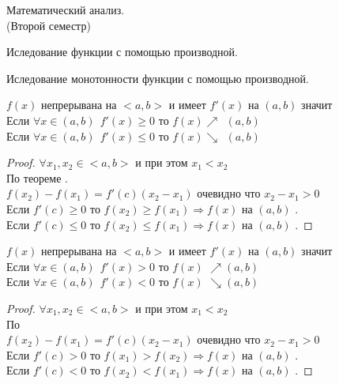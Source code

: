 \begin{title}
  Математический анализ.\\
  (Второй семестр)
\end{title}

\begin{title}
  Иследование функции с помощью производной.
\end{title}

\begin{title}[\Large]
  Иследование монотонности функции с помощью производной.
\end{title}

\begin{theorem}
  $f(x)$ непрерывана на $<a,b>$ и имеет $f'(x)$ на $(a,b)$ значит
  \\
  Если $\forall x \in (a,b) ~~ f'(x) \ge 0 $ то $f(x) \nearrow ~~ (a,b)$\\
  Если $\forall x \in (a,b) ~~ f'(x) \le 0 $ то $f(x) \searrow ~~ (a,b)$
\end{theorem}

\begin{proof}
  $\forall x_1, x_2 \in <a,b>$ и при этом $x_1 < x_2 $\\
  По теореме .\\
  $f(x_2) - f(x_1) = f'(c)(x_2 - x_1)$ очевидно что $x_2 - x_1 > 0 $\\
  Если $f'(c) \ge 0$ то $f(x_2) \ge f(x_1) \Rightarrow f(x)$ на $(a,b)$
  .\\
  Если $f'(c) \le 0$ то $f(x_2) \le f(x_1) \Rightarrow f(x)$ на $(a,b)$
  .
\end{proof}

\begin{theorem}
  $f(x)$ непрерывана на $<a,b>$ и имеет $f'(x)$ на $(a,b)$ значит\\
  Если $\forall x \in (a, b) ~~ f'(x) > 0$ то $f(x)$ 
  $\nearrow (a, b)$\\
  Если $\forall x \in (a, b) ~~ f'(x) < 0$ то $f(x)$ 
  $\searrow (a, b)$
\end{theorem}

\begin{proof}
  $\forall x_1, x_2 \in <a,b>$ и при этом $x_1 < x_2 $\\
  По \\
  $f(x_2) - f(x_1) = f'(c)(x_2 - x_1)$ очевидно что $x_2 - x_1 > 0$\\
  Если $f'(c) > 0$ то $f(x_1) > f(x_2) \Rightarrow f(x)$ на $(a,b)$
  .\\
  Если $f'(c) < 0$ то $f(x_2) < f(x_1) \Rightarrow f(x)$ на $(a,b)$
  .
\end{proof}

